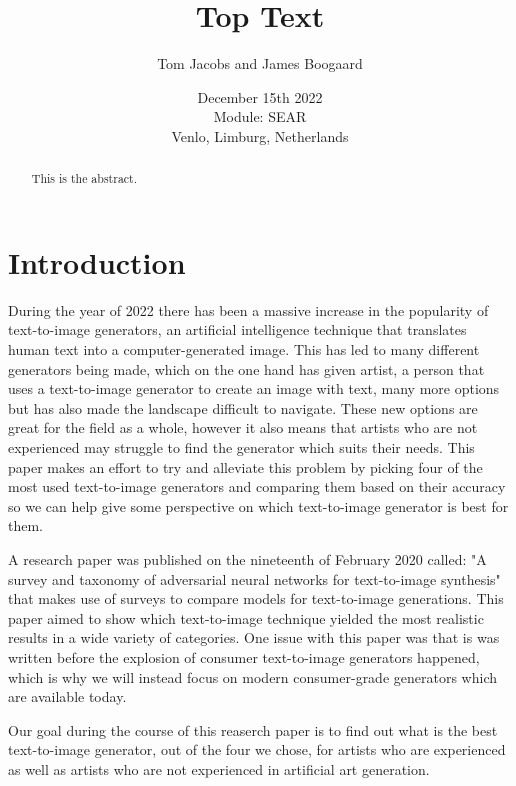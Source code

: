 \documentclass[]{report}
\title{Top Text}
\author{Tom Jacobs and James Boogaard}
\date{December 15th 2022 \\Module: SEAR \\Venlo, Limburg, Netherlands}
\begin{document}
	
	\maketitle
	
	\begin{abstract}
		This is the abstract.
		
		
	\end{abstract}
	
	\tableofcontents
	\setcounter{page}{3}
	\listoffigures %
	\pagebreak
	
	
	\section{Introduction}
	During the year of 2022 there has been a massive increase in the popularity of text-to-image generators, an artificial intelligence technique that translates human text into a computer-generated image. This has led to many different generators being made, which on the one hand has given artist, a person that uses a text-to-image generator to create an image with text, many more options but has also made the landscape difficult to navigate. These new options are great for the field as a whole, however it also means that artists who are not experienced may struggle to find the generator which suits their needs. This paper makes an effort to try and alleviate this problem by picking four of the most used text-to-image generators and comparing them based on their accuracy so we can help give some perspective on which text-to-image generator is best for them.
	
	A research paper was published on the nineteenth of February 2020 called: "A survey and taxonomy of adversarial neural networks for text-to-image synthesis" that makes use of surveys to compare models for text-to-image generations. This paper aimed to show which text-to-image technique yielded the most realistic results in a wide variety of categories. One issue with this paper was that is was written before the explosion of consumer text-to-image generators happened, which is why we will instead focus on modern consumer-grade generators which are available today.
	
	Our goal during the course of this reaserch paper is to find out what is the best text-to-image generator, out of the four we chose, for artists who are experienced as well as artists who are not experienced in artificial art generation.
	
\end{document}
